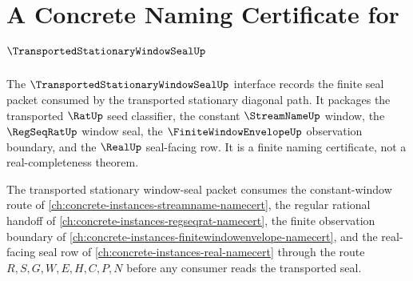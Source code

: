 \chapter{A Concrete Naming Certificate for $\TransportedStationaryWindowSealUp$}
\label{ch:concrete-instances-transportedstationarywindowseal-namecert}

The $\TransportedStationaryWindowSealUp$ interface records the finite seal packet consumed by the transported stationary diagonal path. It packages the transported $\RatUp$ seed classifier, the constant $\StreamNameUp$ window, the $\RegSeqRatUp$ window seal, the $\FiniteWindowEnvelopeUp$ observation boundary, and the $\RealUp$ seal-facing row. It is a finite naming certificate, not a real-completeness theorem.

The transported stationary window-seal packet consumes the constant-window
route of \autoref{ch:concrete-instances-streamname-namecert}, the regular
rational handoff of \autoref{ch:concrete-instances-regseqrat-namecert}, the
finite observation boundary of
\autoref{ch:concrete-instances-finitewindowenvelope-namecert}, and the
real-facing seal row of \autoref{ch:concrete-instances-real-namecert} through
the route $R,S,G,W,E,H,C,P,N$ before any consumer reads the transported seal.

